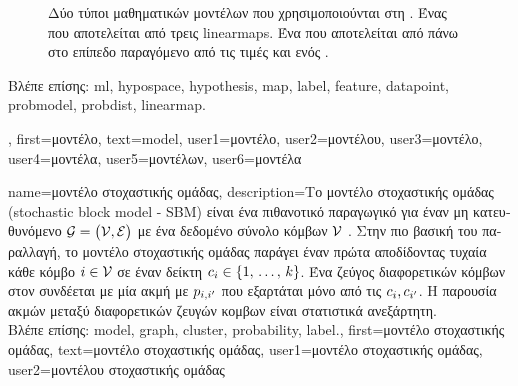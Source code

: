 {{\begin{figure}[H]
		{
		\caption{\foreignlanguage{greek}{Δύο τύποι μαθηματικών μοντέλων που χρησιμοποιούνται στη} . 
		 \foreignlanguage{greek}{Ένας}  \foreignlanguage{greek}{που 
		αποτελείται από τρεις} \gls{linearmap}s.  \foreignlanguage{greek}{Ένα}  
		\foreignlanguage{greek}{που αποτελείται από}  \foreignlanguage{greek}{πάνω στο επίπεδο 
		παραγόμενο από τις τιμές}  \foreignlanguage{greek}{και}  \foreignlanguage{greek}{ενός} 
		. \label{fig_model_dict}} }
		\end{figure}
		\foreignlanguage{greek}{Βλέπε επίσης:} \gls{ml}, \gls{hypospace}, \gls{hypothesis}, \gls{map}, \gls{label}, 
		\gls{feature}, \gls{datapoint}, \gls{probmodel}, \gls{probdist}, \gls{linearmap}.},
	first={\foreignlanguage{greek}{μοντέλο}},
	text={mod\-el},
	user1={\foreignlanguage{greek}{μοντέλο}}, %
	user2={\foreignlanguage{greek}{μοντέλου}}, %
	user3={\foreignlanguage{greek}{μοντέλο}}, %
	user4={\foreignlanguage{greek}{μοντέλα}}, %
	user5={\foreignlanguage{greek}{μοντέλων}}, %
	user6={\foreignlanguage{greek}{μοντέλα}} %
}

{name={\foreignlanguage{greek}{μοντέλο στοχαστικής ομάδας}},
	description={\foreignlanguage{greek}{Το μοντέλο στοχαστικής ομάδας}
		(sto\-chastic block model - SBM) \foreignlanguage{greek}{είναι ένα πιθανοτικό παραγωγικό}  
		\foreignlanguage{greek}{για έναν μη κατευθυνόμενο}  $\mathcal{G} = \big( \mathcal{V}, \mathcal{E} \big)$ 
		\foreignlanguage{greek}{με ένα δεδομένο σύνολο κόμβων} $\mathcal{V}$ \cite{AbbeSBM2018}. \foreignlanguage{greek}{Στην πιο 
		βασική του παραλλαγή, το μοντέλο στοχαστικής ομάδας παράγει έναν}  
		\foreignlanguage{greek}{πρώτα αποδίδοντας τυχαία κάθε κόμβο $i \in \mathcal{V}$ σε έναν δείκτη} 
		 $c_{i} \in \{1, \,\ldots, \,k\}$. \foreignlanguage{greek}{Ένα ζεύγος διαφορετικών 
		κόμβων στον}  \foreignlanguage{greek}{συνδέεται με μία ακμή με}  $p_{i,i'}$ 
		\foreignlanguage{greek}{που εξαρτάται μόνο από τις}  $c_{i}, c_{i'}$. 
		\foreignlanguage{greek}{Η παρουσία ακμών μεταξύ διαφορετικών ζευγών κομβων είναι στατιστικά ανεξάρτητη.} \\
		\foreignlanguage{greek}{Βλέπε επίσης:} \gls{model}, \gls{graph}, \gls{cluster}, \gls{probability}, \gls{label}.},
	first={\foreignlanguage{greek}{μοντέλο στοχαστικής ομάδας}},
	text={\foreignlanguage{greek}{μοντέλο στοχαστικής ομάδας}},
	user1={\foreignlanguage{greek}{μοντέλο στοχαστικής ομάδας}}, %
    	user2={\foreignlanguage{greek}{μοντέλου στοχαστικής ομάδας}} %
}

